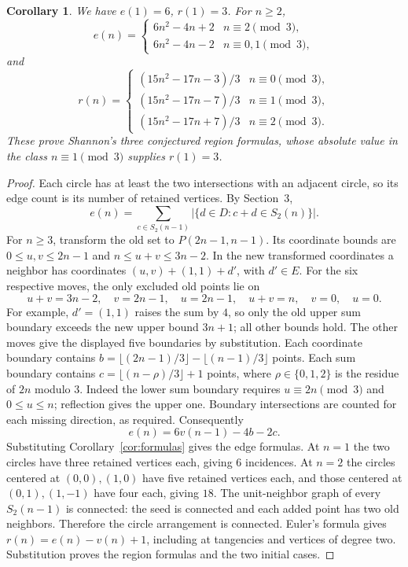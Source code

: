 \documentclass[11pt]{article}
\newtheorem{corollary}[theorem]{Corollary}
\begin{document}
\begin{corollary}\label{cor:regions}
We have $e(1)=6$, $r(1)=3$. For $n\geq2$,
\[
e(n)=\begin{cases}6n^2-4n+2&n\equiv2\pmod3,\\
6n^2-4n-2&n\equiv0,1\pmod3,\end{cases}
\]
and
\[
r(n)=\begin{cases}
(15n^2-17n-3)/3&n\equiv0\pmod3,\\
(15n^2-17n-7)/3&n\equiv1\pmod3,\\
(15n^2-17n+7)/3&n\equiv2\pmod3.
\end{cases}
\]
These prove Shannon's three conjectured region formulas, whose
absolute value in the class $n\equiv1\pmod3$ supplies $r(1)=3$.
\end{corollary}
\begin{proof}
Each circle has at least the two intersections with an adjacent circle,
so its edge count is its number of retained vertices. By Section~3,
\[
 e(n)=\sum_{c\in S_2(n-1)}|\{d\in D:c+d\in S_2(n)\}|.
\]
For $n\geq3$, transform the old set to $P(2n-1,n-1)$. Its coordinate
bounds are $0\leq u,v\leq2n-1$ and
$n\leq u+v\leq3n-2$. In the new transformed coordinates a neighbor
has coordinates $(u,v)+(1,1)+d'$, with $d'\in E$.
For the six respective moves, the only excluded old points lie on
\[
 u+v=3n-2,\quad v=2n-1,\quad u=2n-1,\quad
 u+v=n,\quad v=0,\quad u=0.
\]
For example, $d'=(1,1)$ raises the sum by $4$, so only the old upper
sum boundary exceeds the new upper bound $3n+1$; all other bounds hold.
The other moves give the displayed five boundaries by substitution.
Each coordinate boundary contains
$b=\lfloor(2n-1)/3\rfloor-\lfloor(n-1)/3\rfloor$ points.
Each sum boundary contains
$c=\lfloor(n-\rho)/3\rfloor+1$ points, where
$\rho\in\{0,1,2\}$ is the residue of $2n$ modulo $3$.
Indeed the lower sum boundary requires $u\equiv2n\pmod3$ and
$0\leq u\leq n$; reflection gives the upper one.
Boundary intersections are counted for each missing direction, as required.
Consequently
\[
 e(n)=6v(n-1)-4b-2c.
\]
Substituting Corollary~\ref{cor:formulas} gives the edge formulas.
At $n=1$ the two circles have three retained vertices each, giving $6$
incidences. At $n=2$ the circles centered at $(0,0),(1,0)$ have five
retained vertices each, and those centered at $(0,1),(1,-1)$ have four
each, giving $18$.
The unit-neighbor graph of every $S_2(n-1)$ is connected: the seed is
connected and each added point has two old neighbors. Therefore the
circle arrangement is connected. Euler's formula gives
$r(n)=e(n)-v(n)+1$, including at tangencies and vertices of degree two.
Substitution proves the region formulas and the two initial cases.
\end{proof}
\end{document}
